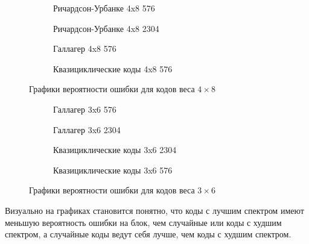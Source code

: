 \begin{figure}[h!]
\centering
\begin{subfigure}{.5\textwidth}
  \centering
  \caption{Ричардсон-Урбанке 4x8 576}
\end{subfigure}%
\begin{subfigure}{.5\textwidth}
  \centering
  \caption{Ричардсон-Урбанке 4x8 2304}
\end{subfigure}


\begin{subfigure}{.5\textwidth}
  \centering
  \caption{Галлагер 4x8 576}
\end{subfigure}%
\begin{subfigure}{.5\textwidth}
  \centering
  \caption{Квазициклические коды 4x8 576}
\end{subfigure}

\caption{Графики вероятности ошибки для кодов веса $4 \times 8$}
\end{figure}

\begin{figure}[h!]
\centering
\begin{subfigure}{.5\textwidth}
  \centering
  \caption{Галлагер 3x6 576}
\end{subfigure}%
\begin{subfigure}{.5\textwidth}
  \centering
  \caption{Галлагер 3x6 2304}
\end{subfigure}

\begin{subfigure}{.5\textwidth}
  \centering
  \caption{Квазициклические коды 3x6 2304}
\end{subfigure}%
\begin{subfigure}{.5\textwidth}
  \centering
  \caption{Квазициклические коды 3x6 576}
\end{subfigure}

\caption{Графики вероятности ошибки для кодов веса $3 \times 6$}
\end{figure}

Визуально на графиках становится понятно, что коды с лучшим спектром имеют меньшую вероятность ошибки
на блок, чем случайные или коды с худшим спектром, а случайные коды ведут себя лучше, чем коды с
худшим спектром.


